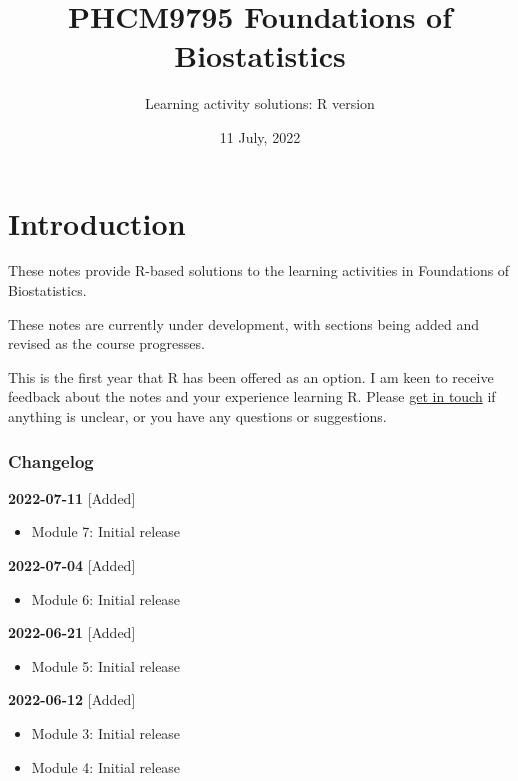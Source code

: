 \documentclass[
]{memoir}
\title{PHCM9795 Foundations of Biostatistics}
\author{Learning activity solutions: R version}
\date{11 July, 2022}
\providecommand{\tightlist}{%
  \setlength{\itemsep}{0pt}\setlength{\parskip}{0pt}}
\begin{document}
\maketitle

{
\setcounter{tocdepth}{1}
\tableofcontents
}
\hypertarget{introduction}{%
\chapter*{Introduction}\label{introduction}}

These notes provide R-based solutions to the learning activities in Foundations of Biostatistics.

These notes are currently under development, with sections being added and revised as the course progresses.

This is the first year that R has been offered as an option. I am keen to receive feedback about the notes and your experience learning R. Please \href{mailto:t.dobbins@unsw.edu.au}{get in touch} if anything is unclear, or you have any questions or suggestions.

\hypertarget{changelog}{%
\subsection*{Changelog}\label{changelog}}

\textbf{2022-07-11}
{[}Added{]}

\begin{itemize}
\tightlist
\item
  Module 7: Initial release
\end{itemize}

\textbf{2022-07-04}
{[}Added{]}

\begin{itemize}
\tightlist
\item
  Module 6: Initial release
\end{itemize}

\textbf{2022-06-21}
{[}Added{]}

\begin{itemize}
\tightlist
\item
  Module 5: Initial release
\end{itemize}

\textbf{2022-06-12}
{[}Added{]}

\begin{itemize}
\tightlist
\item
  Module 3: Initial release
\item
  Module 4: Initial release
\end{itemize}
\end{document}
